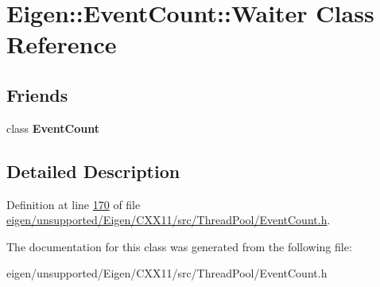 \hypertarget{class_eigen_1_1_event_count_1_1_waiter}{}\section{Eigen\+:\+:Event\+Count\+:\+:Waiter Class Reference}
\label{class_eigen_1_1_event_count_1_1_waiter}
\subsection*{Friends}
\begin{DoxyCompactItemize}
\item 
\mbox{\label{class_eigen_1_1_event_count_1_1_waiter_aa0f4ad8033bae939415935e053a93782}} 
class {\bfseries Event\+Count}
\end{DoxyCompactItemize}


\subsection{Detailed Description}


Definition at line \hyperlink{eigen_2unsupported_2_eigen_2_c_x_x11_2src_2_thread_pool_2_event_count_8h_source_l00170}{170} of file \hyperlink{eigen_2unsupported_2_eigen_2_c_x_x11_2src_2_thread_pool_2_event_count_8h_source}{eigen/unsupported/\+Eigen/\+C\+X\+X11/src/\+Thread\+Pool/\+Event\+Count.\+h}.



The documentation for this class was generated from the following file\+:\begin{DoxyCompactItemize}
\item 
eigen/unsupported/\+Eigen/\+C\+X\+X11/src/\+Thread\+Pool/\+Event\+Count.\+h\end{DoxyCompactItemize}
